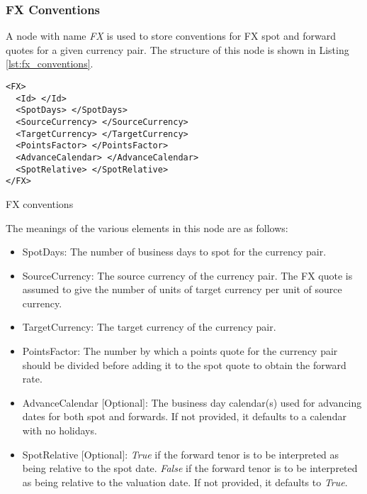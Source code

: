 \subsubsection{FX Conventions}\label{sss:fx_convention}
A node with name \emph{FX} is used to store conventions for FX spot and forward quotes for a given currency pair. The
structure of this node is shown in Listing \ref{lst:fx_conventions}.

\begin{listing}[H]
\begin{verbatim}
<FX>
  <Id> </Id>
  <SpotDays> </SpotDays>
  <SourceCurrency> </SourceCurrency>
  <TargetCurrency> </TargetCurrency>
  <PointsFactor> </PointsFactor>
  <AdvanceCalendar> </AdvanceCalendar>
  <SpotRelative> </SpotRelative>
</FX>
\end{verbatim}
\caption{FX conventions}
\label{lst:fx_conventions}
\end{listing}


The meanings of the various elements in this node are as follows:
\begin{itemize}
\item SpotDays: The number of business days to spot for the currency pair.
\item SourceCurrency: The source currency of the currency pair. The FX quote is assumed to give the number of units of
target currency per unit of source currency.
\item TargetCurrency: The target currency of the currency pair.
\item PointsFactor: The number by which a points quote for the currency pair should be divided before adding it to the
spot quote to obtain the forward rate.
\item AdvanceCalendar [Optional]: The business day calendar(s) used for advancing dates for both spot and forwards. If
not provided, it defaults to a calendar with no holidays.
\item SpotRelative [Optional]: \emph{True} if the forward tenor is to be interpreted as being relative to the spot date.
\emph{False} if the forward tenor is to be interpreted as being relative to the valuation date. If not provided, it
defaults to \emph{True}.
\end{itemize}

